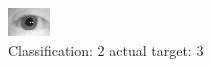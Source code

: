 \begin{figure}[h!]
\begin{center}
\includegraphics[width=0.60\columnwidth]{figures/ID1100_class_2_target_3.png}
\end{center}
\caption{ Classification: 2 actual target: 3}
\label{fig:ID1100_class_2_target_3}
\end{figure}
